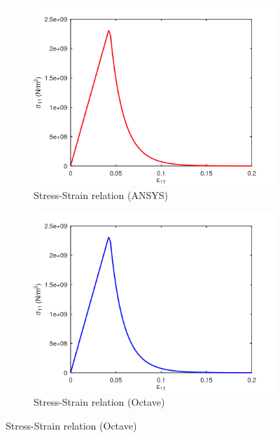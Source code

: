 \documentclass[a4paper,12pt]{extarticle}
\begin{document}
\begin{figure}[htbp]
     \centering
     \captionsetup[subfigure]{justification=centering}
     \begin{subfigure}{0.4\textwidth}
         \centering
         \includegraphics[width=1.25\textwidth]{21.StressvsStrain_Ansys.png}
         \caption{Stress-Strain relation (ANSYS)}
         \label{fig:Stress-Strain relation in Ansys}
     \end{subfigure}
     \hfill
     \begin{subfigure}{0.4\textwidth}
         \centering
         \includegraphics[width=1.25\textwidth]{21.StressvsStrain_Octave.png}
         \caption{Stress-Strain relation (Octave)}
         \label{fig:Stress-Strain relation Octave}
     \end{subfigure}
\end{figure}
\end{document}
